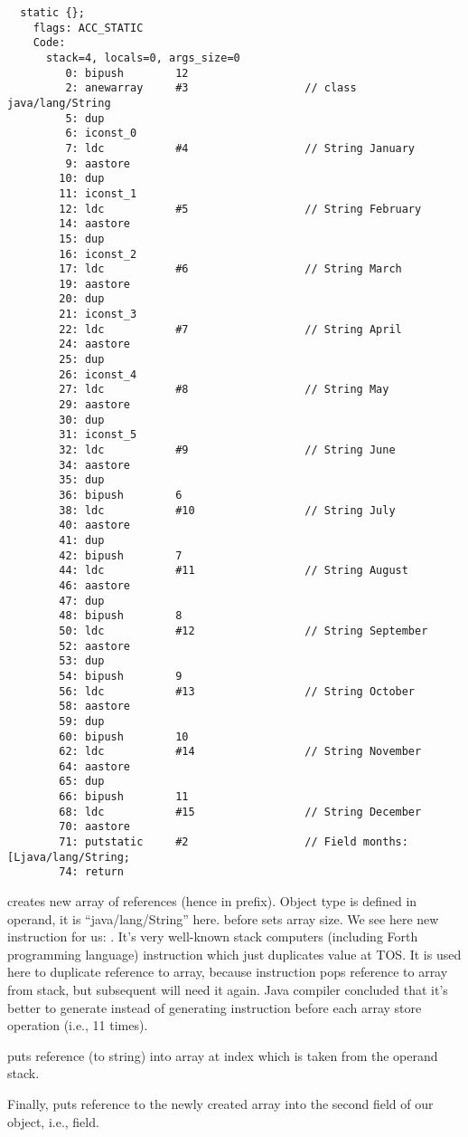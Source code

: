 \begin{lstlisting}
  static {};
    flags: ACC_STATIC
    Code:
      stack=4, locals=0, args_size=0
         0: bipush        12
         2: anewarray     #3                  // class java/lang/String
         5: dup           
         6: iconst_0      
         7: ldc           #4                  // String January
         9: aastore       
        10: dup           
        11: iconst_1      
        12: ldc           #5                  // String February
        14: aastore       
        15: dup           
        16: iconst_2      
        17: ldc           #6                  // String March
        19: aastore       
        20: dup           
        21: iconst_3      
        22: ldc           #7                  // String April
        24: aastore       
        25: dup           
        26: iconst_4      
        27: ldc           #8                  // String May
        29: aastore       
        30: dup           
        31: iconst_5      
        32: ldc           #9                  // String June
        34: aastore       
        35: dup           
        36: bipush        6
        38: ldc           #10                 // String July
        40: aastore       
        41: dup           
        42: bipush        7
        44: ldc           #11                 // String August
        46: aastore       
        47: dup           
        48: bipush        8
        50: ldc           #12                 // String September
        52: aastore       
        53: dup           
        54: bipush        9
        56: ldc           #13                 // String October
        58: aastore       
        59: dup           
        60: bipush        10
        62: ldc           #14                 // String November
        64: aastore       
        65: dup           
        66: bipush        11
        68: ldc           #15                 // String December
        70: aastore       
        71: putstatic     #2                  // Field months:[Ljava/lang/String;
        74: return        
\end{lstlisting}

 creates new array of references (hence  in prefix).
Object type is defined in  operand, it is ``java/lang/String'' here.
 before  sets array size.
We see here new instruction for us: .
It's very well-known stack computers (including Forth programming language) instruction
which just duplicates value at \ac{TOS}.
It is used here to duplicate reference to array, because  instruction pops
reference to array from stack, but subsequent  will need it again.
Java compiler concluded that it's better to generate  instead of generating 
 instruction before each array store operation (i.e., 11 times).

 puts reference (to string) into array at index which is taken from the operand stack.

Finally,  puts reference to the newly created array into the second field 
of our object, i.e.,  field.
